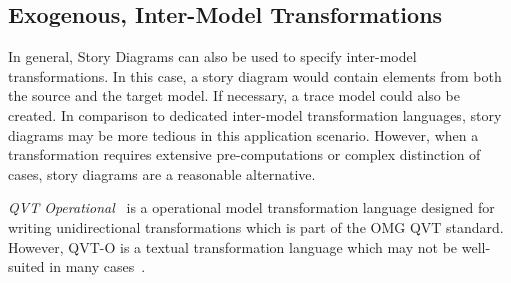 

\subsection{Exogenous, Inter-Model Transformations}

In general, Story Diagrams can also be used to specify inter-model transformations.
In this case, a story diagram would contain elements from both the source and the target model.
If necessary, a trace model could also be created.
In comparison to dedicated inter-model transformation languages, story diagrams may be more tedious in this application scenario.
However, when a transformation requires extensive pre-computations or complex distinction of cases, story diagrams are a reasonable alternative.

\emph{QVT Operational}~\cite{QVT} is a operational model transformation language designed for writing unidirectional transformations which is part of the OMG QVT standard. %
However, QVT-O is a textual transformation language which may not be well-suited in many cases~\cite{Moo09}.

